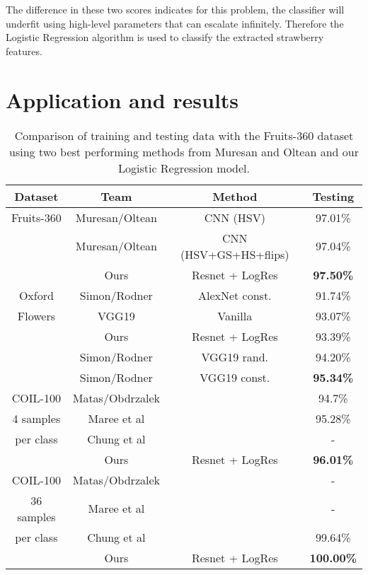 \documentclass[conference]{IEEEtran}
\begin{document}
The difference in these two scores indicates for this problem, the classifier will underfit using high-level parameters that can escalate infinitely. Therefore the Logistic Regression algorithm is used to classify the extracted strawberry features. 









\section{Application and results}




\begin{table}[ht]
	\centering
	\caption{Comparison of training and testing data with the Fruits-360 dataset using two best performing methods from Muresan and Oltean and our Logistic Regression model.}
	\label{tab:gen_results}
	\begin{tabular}{c c c c} 
		\hline
		Dataset & Team & Method & Testing  \\ [0.5ex] 
		\hline
		Fruits-360  & Muresan/Oltean    & CNN (HSV)                 & 97.01\% \\
		& Muresan/Oltean    & CNN (HSV+GS+HS+flips)     & 97.04\% \\
		& Ours              & Resnet + LogRes           & \textbf{97.50\%} \\ 
		\hline
		Oxford      & Simon/Rodner      & AlexNet const.            & 91.74\% \\
		Flowers     & VGG19             & Vanilla                   & 93.07\% \\
		& Ours              & Resnet + LogRes           & 93.39\% \\ 
		& Simon/Rodner      & VGG19 rand.               & 94.20\% \\
		& Simon/Rodner      & VGG19 const.              & \textbf{95.34\%} \\
		\hline
		COIL-100    & Matas/Obdrzalek   &                           & 94.7\% \\
		4 samples   & Maree et al       &                           & 95.28\% \\
		per class   & Chung et al       &                           & - \\
		& Ours              & Resnet + LogRes            & \textbf{96.01\%} \\
		
		\hline
		COIL-100    & Matas/Obdrzalek   &                           & - \\
		36 samples  & Maree et al       &                           & - \\
		per class   & Chung et al       &                           & 99.64\% \\
		&  Ours             & Resnet + LogRes            & \textbf{100.00\%}\\
		\hline
	\end{tabular}
\end{table}
\end{document}
